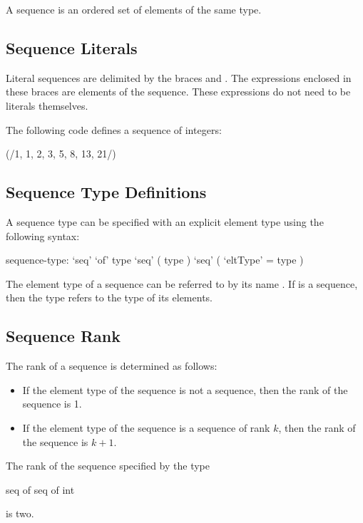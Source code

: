 \label{Sequences}

A sequence is an ordered set of elements of the same type.

\subsection{Sequence Literals}
\label{Sequence_Literals}

Literal sequences are delimited by the braces \chpl{(/} and \chpl{/)}.
The expressions enclosed in these braces are elements of the sequence.
These expressions do not need to be literals themselves.
\begin{example}
The following code defines a sequence of integers:
\begin{chapel}
(/1, 1, 2, 3, 5, 8, 13, 21/)
\end{chapel}
\end{example}

\subsection{Sequence Type Definitions}
\label{Sequence_Type_Definitions}

A sequence type can be specified with an explicit element type using
the following syntax:
\begin{syntax}
sequence-type:
  `seq' `of' type
  `seq' ( type )
  `seq' ( `eltType' = type )
\end{syntax}

The element type of a sequence can be referred to by its
name .  If  is a sequence, then the
type  refers to the type of its elements.

\subsection{Sequence Rank}
\label{Sequence_Rank}

The rank of a sequence is determined as follows:
\begin{itemize}
\item
If the element type of the sequence is not a sequence, then the rank
of the sequence is 1.
\item
If the element type of the sequence is a sequence of rank $k$, then
the rank of the sequence is $k+1$.
\end{itemize}
\begin{example}
The rank of the sequence specified by the type
\begin{chapel}
  seq of seq of int
\end{chapel}
is two.
\end{example}

